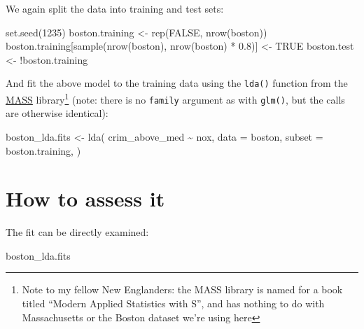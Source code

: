 \documentclass[
]{book}
\newenvironment{Shaded}{\begin{snugshade}}{\end{snugshade}}
\newcommand{\AttributeTok}[1]{\textcolor[rgb]{0.77,0.63,0.00}{#1}}
\newcommand{\ConstantTok}[1]{\textcolor[rgb]{0.00,0.00,0.00}{#1}}
\newcommand{\DecValTok}[1]{\textcolor[rgb]{0.00,0.00,0.81}{#1}}
\newcommand{\FloatTok}[1]{\textcolor[rgb]{0.00,0.00,0.81}{#1}}
\newcommand{\FunctionTok}[1]{\textcolor[rgb]{0.00,0.00,0.00}{#1}}
\newcommand{\NormalTok}[1]{#1}
\newcommand{\OtherTok}[1]{\textcolor[rgb]{0.56,0.35,0.01}{#1}}
\newcommand{\SpecialCharTok}[1]{\textcolor[rgb]{0.00,0.00,0.00}{#1}}
\begin{document}
We again split the data into training and test sets:

\begin{Shaded}
\begin{Highlighting}[]
\FunctionTok{set.seed}\NormalTok{(}\DecValTok{1235}\NormalTok{)}
\NormalTok{boston.training }\OtherTok{\textless{}{-}} \FunctionTok{rep}\NormalTok{(}\ConstantTok{FALSE}\NormalTok{, }\FunctionTok{nrow}\NormalTok{(boston))}
\NormalTok{boston.training[}\FunctionTok{sample}\NormalTok{(}\FunctionTok{nrow}\NormalTok{(boston), }\FunctionTok{nrow}\NormalTok{(boston) }\SpecialCharTok{*} \FloatTok{0.8}\NormalTok{)] }\OtherTok{\textless{}{-}} \ConstantTok{TRUE}
\NormalTok{boston.test }\OtherTok{\textless{}{-}} \SpecialCharTok{!}\NormalTok{boston.training}
\end{Highlighting}
\end{Shaded}

And fit the above model to the training data using the \texttt{lda()} function from the \href{https://cran.r-project.org/web/packages/MASS/index.html}{MASS} library\footnote{Note to my fellow New Englanders: the MASS library is named for a book titled ``Modern Applied Statistics with S'', and has nothing to do with Massachusetts or the Boston dataset we're using here} (note: there is no \texttt{family} argument as with \texttt{glm()}, but the calls are otherwise identical):

\begin{Shaded}
\begin{Highlighting}[]
\NormalTok{boston\_lda.fits }\OtherTok{\textless{}{-}}
  \FunctionTok{lda}\NormalTok{(}
\NormalTok{    crim\_above\_med }\SpecialCharTok{\textasciitilde{}}\NormalTok{ nox,}
    \AttributeTok{data =}\NormalTok{ boston,}
    \AttributeTok{subset =}\NormalTok{ boston.training,}
\NormalTok{  )}
\end{Highlighting}
\end{Shaded}

\hypertarget{how-to-assess-it-3}{%
\section{How to assess it}\label{how-to-assess-it-3}}

The fit can be directly examined:

\begin{Shaded}
\begin{Highlighting}[]
\NormalTok{boston\_lda.fits}
\end{Highlighting}
\end{Shaded}
\end{document}
